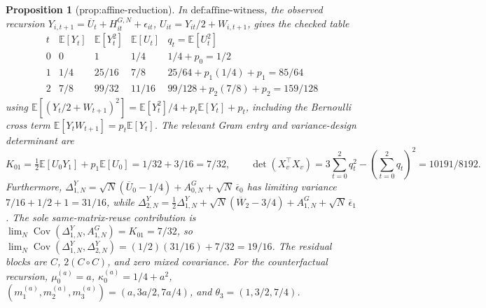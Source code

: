\documentclass{article}
\newtheorem{proposition}{Proposition}
\begin{document}
\begin{proposition}[prop:affine-reduction]\label{prop:affine-reduction}
In \(\text{def:affine-witness}\), the observed recursion \(Y_{i,t+1}=\overline U_t+H_{it}^{G,N}+\epsilon_{it}\), \(U_{it}=Y_{it}/2+W_{i,t+1}\), gives the checked table \[\begin{array}{c|c|c|c|c}t&\mathbb E[Y_t]&\mathbb E[Y_t^2]&\mathbb E[U_t]&q_t=\mathbb E[U_t^2]\\\hline 0&0&1&1/4&1/4+p_0=1/2\\1&1/4&25/16&7/8&25/64+p_1(1/4)+p_1=85/64\\2&7/8&99/32&11/16&99/128+p_2(7/8)+p_2=159/128\end{array}\] using \(\mathbb E[(Y_t/2+W_{t+1})^2]=\mathbb E[Y_t^2]/4+p_t\mathbb E[Y_t]+p_t\), including the Bernoulli cross term \(\mathbb E[Y_tW_{t+1}]=p_t\mathbb E[Y_t]\). The relevant Gram entry and variance-design determinant are \[K_{01}=\tfrac12\mathbb E[U_0Y_1]+p_1\mathbb E[U_0]=1/32+3/16=7/32,\qquad \det(X_v^{\top}X_v)=3\sum_{t=0}^2q_t^2-\left(\sum_{t=0}^2q_t\right)^2=10191/8192.\] Furthermore, \(\Delta_{1,N}^{Y}=\sqrt N(\overline U_0-1/4)+A_{0,N}^{G}+\sqrt N\,\overline\epsilon_0\) has limiting variance \(7/16+1/2+1=31/16\), while \(\Delta_{2,N}^{Y}=\tfrac12\Delta_{1,N}^{Y}+\sqrt N(\overline W_2-3/4)+A_{1,N}^{G}+\sqrt N\,\overline\epsilon_1\). The sole same-matrix-reuse contribution is \(\lim_N\operatorname{Cov}(\Delta_{1,N}^{Y},A_{1,N}^{G})=K_{01}=7/32\), so \(\lim_N\operatorname{Cov}(\Delta_{1,N}^{Y},\Delta_{2,N}^{Y})=(1/2)(31/16)+7/32=19/16\). The residual blocks are \(C\), \(2(C\circ C)\), and zero mixed covariance. For the counterfactual recursion, \(\mu_0^{(a)}=a\), \(\kappa_0^{(a)}=1/4+a^2\), \((m_1^{(a)},m_2^{(a)},m_3^{(a)})=(a,3a/2,7a/4)\), and \(\theta_3=(1,3/2,7/4)\).
\end{proposition}
\end{document}
